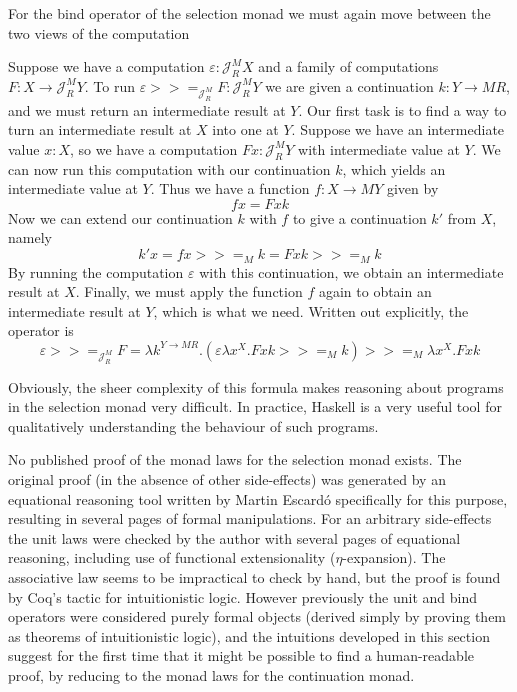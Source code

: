 \documentclass{article}
\newcommand\J{\mathscr J}
\renewcommand\epsilon\varepsilon
\newcommand\bind{>\!\!>\!\!=}
\begin{document}
For the bind operator of the selection monad we must again move between the two views of the computation
\begin{center}\end{center}
Suppose we have a computation $\epsilon : \J^M_R X$ and a family of computations $F : X \to \J^M_R Y$. To run $\epsilon \bind_{\J^M_R} F : \J^M_R Y$ we are given a continuation $k : Y \to MR$, and we must return an intermediate result at $Y$. Our first task is to find a way to turn an intermediate result at $X$ into one at $Y$. Suppose we have an intermediate value $x : X$, so we have a computation $Fx : \J^M_R Y$ with intermediate value at $Y$. We can now run this computation with our continuation $k$, which yields an intermediate value at $Y$. Thus we have a function $f : X \to MY$ given by
\[ fx = Fxk \]
Now we can extend our continuation $k$ with $f$ to give a continuation $k'$ from $X$, namely
\[ k'x = fx \bind_M k = Fxk \bind_M k \]
By running the computation $\epsilon$ with this continuation, we obtain an intermediate result at $X$. Finally, we must apply the function $f$ again to obtain an intermediate result at $Y$, which is what we need. Written out explicitly, the operator is
\[ \epsilon \bind_{\J^M_R} F = \lambda k^{Y \to MR} . (\epsilon \lambda x^X . Fxk \bind_M k) \bind_M \lambda x^X . Fxk \]

Obviously, the sheer complexity of this formula makes reasoning about programs in the selection monad very difficult. In practice, Haskell is a very useful tool for qualitatively understanding the behaviour of such programs.

No published proof of the monad laws for the selection monad exists. The original proof (in the absence of other side-effects) was generated by an equational reasoning tool written by Martin Escard\'o specifically for this purpose, resulting in several pages of formal manipulations. For an arbitrary side-effects the unit laws were checked by the author with several pages of equational reasoning, including use of functional extensionality ($\eta$-expansion). The associative law seems to be impractical to check by hand, but the proof is found by Coq's tactic for intuitionistic logic. However previously the unit and bind operators were considered purely formal objects (derived simply by proving them as theorems of intuitionistic logic), and the intuitions developed in this section suggest for the first time that it might be possible to find a human-readable proof, by reducing to the monad laws for the continuation monad.
\end{document}

